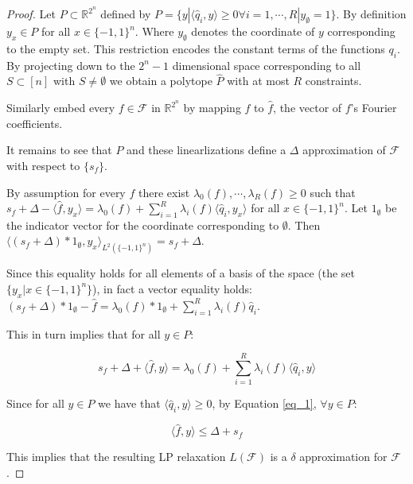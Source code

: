 \begin{proof}
 Let $P \subset \mathbb{R}^{2^n}$ defined by $P = \{y | \langle \hat{q}_i, y \rangle \geq 0 \forall i=1, \cdots, R | y_\emptyset = 1 \}$. By definition $y_x \in P$ for all $x \in \{-1,1\}^n$. Where $y_\emptyset$ denotes the coordinate of $y$ corresponding to the empty set. This restriction encodes the constant terms of the functions $q_i$. By projecting down to the $2^{n}-1$ dimensional space corresponding to all $S \subset [n]$ with $S \neq \emptyset$ we obtain a polytope $\hat{P}$ with at most $R$ constraints. 
 
 Similarly embed every $f \in \mathcal{F}$ in $\mathbb{R}^{2^n}$ by mapping $f$ to $\hat{f}$, the vector of $f$'s Fourier coefficients.
 
 It remains to see that $P$ and these linearlizations define a $\Delta$ approximation of $\mathcal{F}$ with respect to $\{s_f\}$.
 
 By assumption for every $f$ there exist $\lambda_0(f), \cdots, \lambda_R(f) \geq 0$ such that $s_f + \Delta - \langle \hat{f}, y_x \rangle = \lambda_0(f) + \sum_{i=1}^R \lambda_i(f) \langle \hat{q}_i, y_x \rangle$ for all $x \in \{-1,1\}^n$.  Let $1_\emptyset$ be the indicator vector for the coordinate corresponding to $\emptyset$. Then $\langle (s_f + \Delta ) *1_\emptyset,y_x \rangle_{L^2(\{-1,1\}^n)} = s_f + \Delta$.
 
 Since this equality holds for all elements of a basis of the space (the set $\{y_x | x \in \{-1,1\}^n\}$), in fact a vector equality holds: $(s_f + \Delta)*1_\emptyset - \hat{f} = \lambda_0(f)*1_\emptyset + \sum_{i=1}^R \lambda_i(f) \hat{q}_i$.
 
 This in turn implies that for all $y \in P$:
 
 \begin{equation}\label{eq_1}
 s_f + \Delta + \langle \hat{f}, y\rangle = \lambda_0(f) + \sum_{i=1}^R \lambda_i(f) \langle \hat{q}_i, y \rangle
 \end{equation}
 
 Since for all $y \in P$ we have that $\langle \hat{q}_i, y \rangle \geq 0$, by Equation \ref{eq_1}, $\forall y \in P$:
 
 \begin{equation}
 \langle \hat{f}, y \rangle \leq \Delta + s_f
 \end{equation}
 
 This implies that the resulting LP relaxation $L(\mathcal{F})$ is a $\delta$ approximation for $\mathcal{F}$.

\end{proof}



